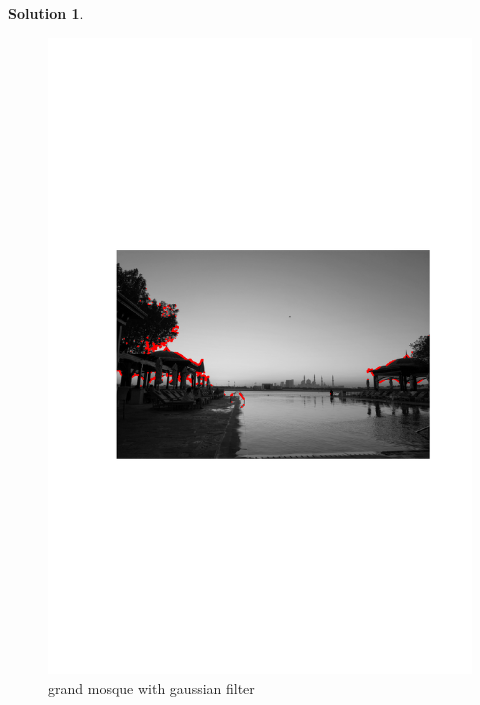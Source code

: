 \documentclass[11pt]{article}
\theoremstyle{plain}
\theoremstyle{definition}
\newtheorem{solution}{Solution}
\theoremstyle{remark}
\begin{document}
\begin{solution}
\begin{enumerate}
			\begin{figure}[h]
				\centering
				\includegraphics[width=\textwidth]{q9_uae_gaussian_filter.png}
				\caption{grand mosque with gaussian filter}
			\end{figure}
			
	\end{enumerate}

\end{solution}
\end{document}
